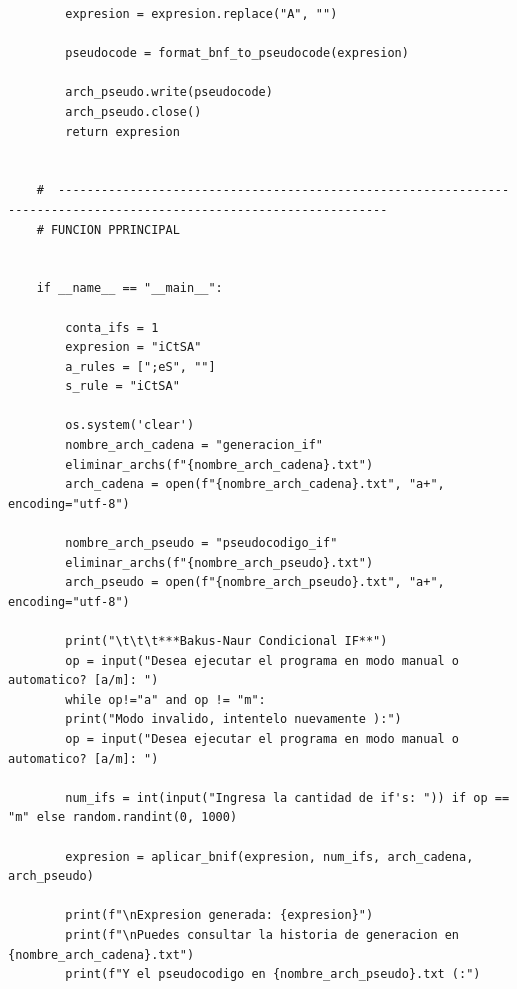 \documentclass[11pt]{article} %
\begin{document}
\begin{lstlisting}
		expresion = expresion.replace("A", "")
		
		pseudocode = format_bnf_to_pseudocode(expresion)
		
		arch_pseudo.write(pseudocode)
		arch_pseudo.close()
		return expresion
	
	
	#  --------------------------------------------------------------------------------------------------------------------
	# FUNCION PPRINCIPAL
	
	
	if __name__ == "__main__":
	
		conta_ifs = 1
		expresion = "iCtSA"
		a_rules = [";eS", ""]
		s_rule = "iCtSA"
		
		os.system('clear')
		nombre_arch_cadena = "generacion_if"
		eliminar_archs(f"{nombre_arch_cadena}.txt")
		arch_cadena = open(f"{nombre_arch_cadena}.txt", "a+", encoding="utf-8")
		
		nombre_arch_pseudo = "pseudocodigo_if"
		eliminar_archs(f"{nombre_arch_pseudo}.txt")
		arch_pseudo = open(f"{nombre_arch_pseudo}.txt", "a+", encoding="utf-8")
		
		print("\t\t\t***Bakus-Naur Condicional IF**")
		op = input("Desea ejecutar el programa en modo manual o automatico? [a/m]: ")
		while op!="a" and op != "m":
		print("Modo invalido, intentelo nuevamente ):")
		op = input("Desea ejecutar el programa en modo manual o automatico? [a/m]: ")
		
		num_ifs = int(input("Ingresa la cantidad de if's: ")) if op == "m" else random.randint(0, 1000)
		
		expresion = aplicar_bnif(expresion, num_ifs, arch_cadena, arch_pseudo)
		
		print(f"\nExpresion generada: {expresion}")
		print(f"\nPuedes consultar la historia de generacion en {nombre_arch_cadena}.txt")
		print(f"Y el pseudocodigo en {nombre_arch_pseudo}.txt (:")
		
		
	\end{lstlisting}
	
	
	
\end{document}

